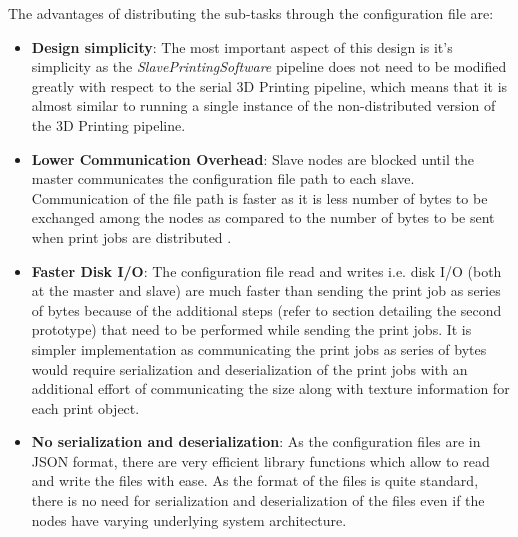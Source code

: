 The advantages of distributing the sub-tasks through the configuration file are:
\begin{itemize}
\item \textbf{Design simplicity}: The most important aspect of this design is it's simplicity as the \textit{SlavePrintingSoftware} pipeline does not need to be modified greatly with respect to the serial 3D Printing pipeline, which means that it is almost similar to running a single instance of the non-distributed version of the 3D Printing pipeline. 
\item \textbf{Lower Communication Overhead}: Slave nodes are blocked until the master communicates the configuration file path to each slave. Communication of the file path is faster as it is less number of bytes to be exchanged among the nodes as compared to the number of bytes to be sent when print jobs are distributed .
\item \textbf{Faster Disk I/O}: The configuration file read and writes i.e. disk I/O (both at the master and slave) are much faster than sending the print job as series of bytes because of the additional steps (refer to section detailing the second prototype) that need to be performed while sending the print jobs. It is simpler implementation as communicating the print jobs as series of bytes would require serialization and deserialization of the print jobs with an additional effort of communicating the size along with texture information for each print object.
\item \textbf{No serialization and deserialization}: As the configuration files are in JSON format, there are very efficient library functions which allow to read and write the files with ease. As the format of the files is quite standard, there is no need for serialization and deserialization of the files even if the nodes have varying underlying system architecture.        
\end{itemize}


